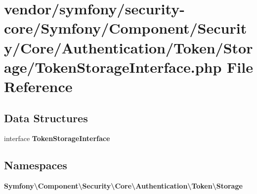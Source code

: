 \section{vendor/symfony/security-\/core/\+Symfony/\+Component/\+Security/\+Core/\+Authentication/\+Token/\+Storage/\+Token\+Storage\+Interface.php File Reference}
\label{_token_storage_interface_8php}
\subsection*{Data Structures}
\begin{DoxyCompactItemize}
\item 
interface {\bf Token\+Storage\+Interface}
\end{DoxyCompactItemize}
\subsection*{Namespaces}
\begin{DoxyCompactItemize}
\item 
 {\bf Symfony\textbackslash{}\+Component\textbackslash{}\+Security\textbackslash{}\+Core\textbackslash{}\+Authentication\textbackslash{}\+Token\textbackslash{}\+Storage}
\end{DoxyCompactItemize}
